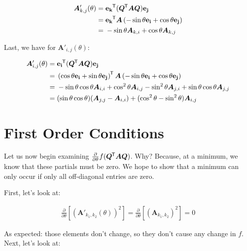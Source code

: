 \documentclass[11pt, oneside]{amsart}
\newcommand{\fpartial}[2]{\frac{\partial #1}{\partial #2}}
\newcommand{\mtx}[1]{\bm{#1}}
\newcommand*{\tran}{^{\mkern-1.5mu\mathsf{T}}}
\renewcommand{\vec}[1]{\mathbf{#1}}
\newcommand{\bvec}[1]{\vec{e_{#1}}}
\newcommand{\fptheta}{\fpartial{}{\theta}}
\newcommand{\mtxA}{\mtx{A}}
\newcommand{\mtxQ}{\mtx{Q}}
\begin{document}
\begin{equation*}
  \begin{split}
    \mtxA'_{k, j}(\theta)
      ={}& \bvec{k}\tran (\mtxQ\tran \mtxA \mtxQ) \bvec{j} \\
      ={}& \bvec{k}\tran \mtxA \left(
        -\sin\theta \bvec{i} + \cos\theta \bvec{j}
      \right) \\
      ={}& -\sin\theta \mtxA_{k, i} + \cos\theta \mtxA_{k, j}
  \end{split}
\end{equation*}

Last, we have for $\mtxA'_{i, j}(\theta)$:

\begin{equation*}
  \begin{split}
    \mtxA'_{i, j}(\theta)
      ={}& \bvec{i}\tran (\mtxQ\tran \mtxA \mtxQ) \bvec{j} \\
      ={}&
        \left( \cos\theta\bvec{i} + \sin\theta\bvec{j} \right)\tran
        \mtxA
        \left( -\sin\theta\bvec{i} + \cos\theta\bvec{j} \right)\\
      ={}&
        -\sin\theta\cos\theta \mtxA_{i, i}
        + \cos^2\theta \mtxA_{i, j}
        -\sin^2\theta \mtxA_{j, i}
        +\sin\theta\cos\theta \mtxA_{j, j} \\
      ={}&
        (\sin\theta\cos\theta)(\mtxA_{j, j} - \mtxA_{i, i})
        + (\cos^2\theta - \sin^2\theta) \mtxA_{i, j}
  \end{split}
\end{equation*}

\section{First Order Conditions}

Let us now begin examining $\fptheta f(\mtxQ\tran \mtxA \mtxQ)$. Why?
Because, at a minimum, we know that these partials must be zero. We hope
to show that a minimum can only occur if only all off-diagonal entries
are zero.

First, let's look at:

\begin{equation*}
  \begin{split}
    \fptheta \left[ \left( \mtxA'_{k_1, k_2}(\theta) \right)^2 \right]
      = \fptheta \left[ \left( \mtxA_{k_1, k_2} \right)^2 \right]
      = 0
  \end{split}
\end{equation*}

As expected: those elements don't change, so they don't cause any change
in $f$. Next, let's look at:
\end{document}
